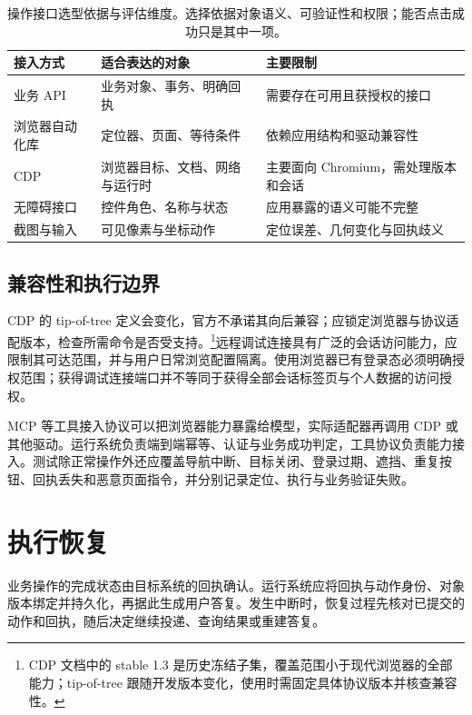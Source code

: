 \documentclass[../textbook.tex]{subfiles}
\begin{document}
\begin{table}[htbp]
\centering
\caption[操作接口选型依据与评估维度]{操作接口选型依据与评估维度。选择依据对象语义、可验证性和权限；能否点击成功只是其中一项。}\label{tab:agent-runtime-browser-interfaces}
\begin{tabularx}{\linewidth}{@{}p{2.3cm}XX@{}}
\toprule 接入方式 & 适合表达的对象 & 主要限制\\\midrule
业务 API & 业务对象、事务、明确回执 & 需要存在可用且获授权的接口\\
浏览器自动化库 & 定位器、页面、等待条件 & 依赖应用结构和驱动兼容性\\
CDP & 浏览器目标、文档、网络与运行时 & 主要面向 Chromium，需处理版本和会话\\
无障碍接口 & 控件角色、名称与状态 & 应用暴露的语义可能不完整\\
截图与输入 & 可见像素与坐标动作 & 定位误差、几何变化与回执歧义\\
\bottomrule
\end{tabularx}
\end{table}

\subsection{兼容性和执行边界}
CDP 的 tip-of-tree 定义会变化，官方不承诺其向后兼容；应锁定浏览器与协议适配版本，检查所需命令是否受支持。\footnote{CDP 文档中的 stable 1.3 是历史冻结子集，覆盖范围小于现代浏览器的全部能力；tip-of-tree 跟随开发版本变化，使用时需固定具体协议版本并核查兼容性。}远程调试连接具有广泛的会话访问能力，应限制其可达范围，并与用户日常浏览配置隔离。使用浏览器已有登录态必须明确授权范围；获得调试连接端口并不等同于获得全部会话标签页与个人数据的访问授权。

MCP 等工具接入协议可以把浏览器能力暴露给模型，实际适配器再调用 CDP 或其他驱动。运行系统负责端到端幂等、认证与业务成功判定，工具协议负责能力接入。测试除正常操作外还应覆盖导航中断、目标关闭、登录过期、遮挡、重复按钮、回执丢失和恶意页面指令，并分别记录定位、执行与业务验证失败。

\section{执行恢复}

业务操作的完成状态由目标系统的回执确认。运行系统应将回执与动作身份、对象版本绑定并持久化，再据此生成用户答复。发生中断时，恢复过程先核对已提交的动作和回执，随后决定继续投递、查询结果或重建答复。
\end{document}
